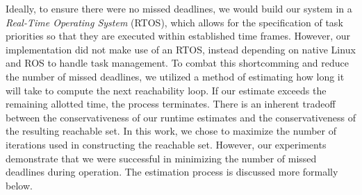 \documentclass[manuscript,screen,review]{acmart}
\newcommand{\todo}[1]{\textcolor{red}{\textbf{\underline{TODO:}} #1}}
\begin{document}
Ideally, to ensure there were no missed deadlines, we would build our system in a \emph{Real-Time Operating System} (RTOS), which allows for the specification of task priorities so that they are executed within established time frames. However, our implementation did not make use of an RTOS, instead depending on native Linux and ROS to handle task management. To combat this shortcomming and reduce the number of missed deadlines, we utilized a method of estimating how long it will take to compute the next reachability loop.  If our estimate exceeds the remaining allotted time, the process terminates. There is an inherent tradeoff between the conservativeness of our runtime estimates and the conservativeness of the resulting reachable set. In this work, we chose to maximize the number of iterations used in constructing the reachable set. However, our experiments demonstrate that we were successful in minimizing the number of missed deadlines during operation. The estimation process is discussed more formally below.







\end{document}
